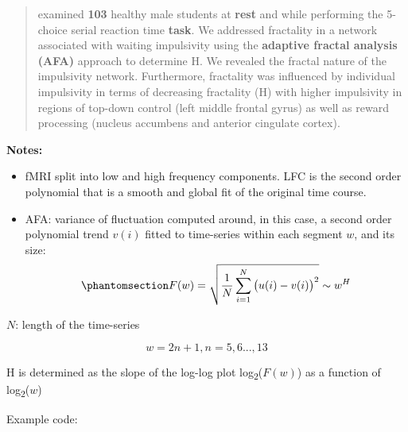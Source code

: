 \documentclass[
  sn-vancouver,
  Numbered,
  referee,
  lineno]{sn-jnl}
\providecommand{\tightlist}{%
  \setlength{\itemsep}{0pt}\setlength{\parskip}{0pt}}\usepackage{longtable,booktabs,array}
\begin{document}
\begin{quote}
examined \textbf{103 } healthy male students at \textbf{rest} and while
performing the 5-choice serial reaction time \textbf{task}. We addressed
fractality in a network associated with waiting impulsivity using the
\textbf{adaptive fractal analysis (AFA)} approach to determine H. We
revealed the fractal nature of the impulsivity network. Furthermore,
fractality was influenced by individual impulsivity in terms of
decreasing fractality (H) with higher impulsivity in regions of top-down
control (left middle frontal gyrus) as well as reward processing
(nucleus accumbens and anterior cingulate cortex).
\end{quote}

\textbf{Notes:}

\begin{itemize}
\tightlist
\item
  fMRI split into low and high frequency components. LFC is the second
  order polynomial that is a smooth and global fit of the original time
  course.
\item
  AFA: variance of fluctuation computed around, in this case, a second
  order polynomial trend \(v(i)\) fitted to time-series within each
  segment \(w\), and its size:
  \begin{equation}\phantomsection\label{eq-AFA}{
  F(w) = \sqrt{\frac{1}{N} \sum_{i=1}^{N} \big(u(i) - v(i)\big)^2} \sim w^H
  }\end{equation}
\end{itemize}

\(N\): length of the time-series

\[
w = 2n + 1, n = 5,6..., 13
\]

H is determined as the slope of the log-log plot
log\textsubscript{2}(\(F(w)\)) as a function of
log\textsubscript{2}(\(w\))

Example code:
\end{document}
